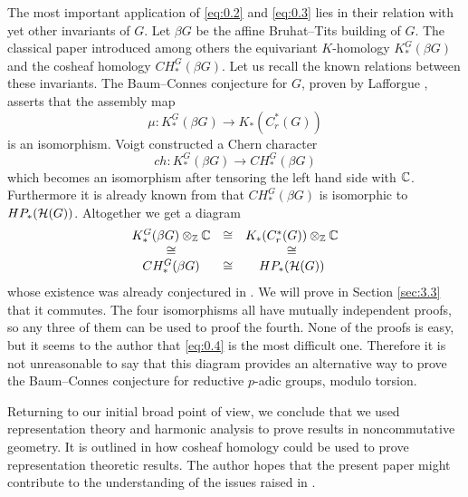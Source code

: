 The most important application of \eqref{eq:0.2} and \eqref{eq:0.3} lies in their relation
with yet other invariants of $G$. Let $\beta G$ be the affine Bruhat--Tits building of $G$.
The classical paper \cite{BCH} introduced among others the equivariant $K$-homology
$K_*^G (\beta G)$ and the cosheaf homology $CH_*^G (\beta G)$. Let us recall the
known relations between these invariants. The Baum--Connes conjecture for $G$,
proven by Lafforgue \cite{Laf}, asserts that the assembly map
\begin{equation}\label{eq:0.4}
\mu : K_*^G (\beta G) \to K_* (C_r^* (G))
\end{equation}
is an isomorphism. Voigt \cite{Voi4} constructed a Chern character 
\begin{equation}\label{eq:0.5}
ch : K_*^G (\beta G) \to CH_*^G (\beta G)
\end{equation}
which becomes an isomorphism after tensoring the left hand side with $\mathbb C$.
Furthermore it is already known from \cite{HiNi} that $CH_*^G (\beta G)$ is 
isomorphic to $HP_* (\mathcal H (G))$. Altogether we get a diagram
\begin{equation}\label{eq:0.6}
\begin{array}{ccc}
K_*^G (\beta G) \otimes_{\mathbb Z} \mathbb C & \cong & 
K_* (C_r^* (G)) \otimes_{\mathbb Z} \mathbb C \\
\cong & & \cong \\
CH_*^G (\beta G) & \cong & HP_* (\mathcal H (G))
\end{array}
\end{equation}
whose existence was already conjectured in \cite{BHP2}. We will prove in Section
\ref{sec:3.3} that it commutes. The four isomorphisms 
all have mutually independent proofs, so any three of them can be used to proof
the fourth. None of the proofs is easy, but it seems to the author that 
\eqref{eq:0.4} is the most difficult one. Therefore
it is not unreasonable to say that this diagram provides an alternative way to prove
the Baum--Connes conjecture for reductive $p$-adic groups, modulo torsion.

Returning to our initial broad point of view, we conclude that we used 
representation theory and harmonic analysis to prove results in noncommutative
geometry. It is outlined in \cite{BHP2} how cosheaf homology could be used to
prove representation theoretic results. The author hopes that the present paper
might contribute to the understanding of the issues raised in \cite{BHP2}.







